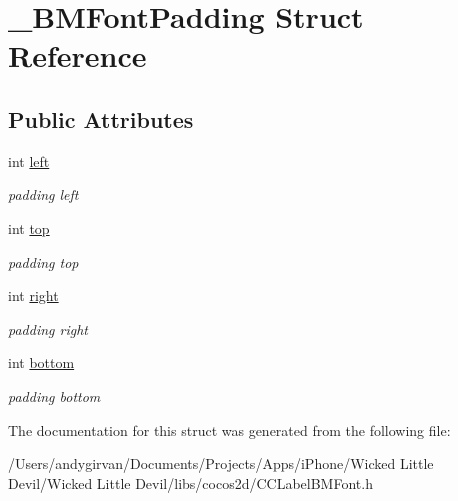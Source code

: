 \hypertarget{struct___b_m_font_padding}{\section{\-\_\-\-B\-M\-Font\-Padding Struct Reference}
\label{struct___b_m_font_padding}
}
\subsection*{Public Attributes}
\begin{DoxyCompactItemize}
\item 
\hypertarget{struct___b_m_font_padding_a8129887cd2f3f177100cd4fedf20e347}{int \hyperlink{struct___b_m_font_padding_a8129887cd2f3f177100cd4fedf20e347}{left}}\label{struct___b_m_font_padding_a8129887cd2f3f177100cd4fedf20e347}

\begin{DoxyCompactList}\small\item\em padding left \end{DoxyCompactList}\item 
\hypertarget{struct___b_m_font_padding_ad673e6ff522f10836afba0745f3c4ee8}{int \hyperlink{struct___b_m_font_padding_ad673e6ff522f10836afba0745f3c4ee8}{top}}\label{struct___b_m_font_padding_ad673e6ff522f10836afba0745f3c4ee8}

\begin{DoxyCompactList}\small\item\em padding top \end{DoxyCompactList}\item 
\hypertarget{struct___b_m_font_padding_ac83f97e64d8fa8a835a17c44d93f9f62}{int \hyperlink{struct___b_m_font_padding_ac83f97e64d8fa8a835a17c44d93f9f62}{right}}\label{struct___b_m_font_padding_ac83f97e64d8fa8a835a17c44d93f9f62}

\begin{DoxyCompactList}\small\item\em padding right \end{DoxyCompactList}\item 
\hypertarget{struct___b_m_font_padding_a41ee44807cde2134c0ff73208dccf6e7}{int \hyperlink{struct___b_m_font_padding_a41ee44807cde2134c0ff73208dccf6e7}{bottom}}\label{struct___b_m_font_padding_a41ee44807cde2134c0ff73208dccf6e7}

\begin{DoxyCompactList}\small\item\em padding bottom \end{DoxyCompactList}\end{DoxyCompactItemize}


The documentation for this struct was generated from the following file\-:\begin{DoxyCompactItemize}
\item 
/\-Users/andygirvan/\-Documents/\-Projects/\-Apps/i\-Phone/\-Wicked Little Devil/\-Wicked Little Devil/libs/cocos2d/C\-C\-Label\-B\-M\-Font.\-h\end{DoxyCompactItemize}
